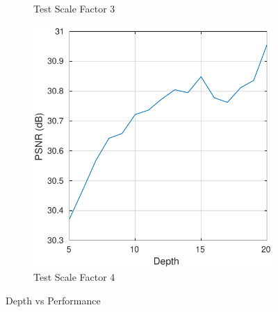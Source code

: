 \documentclass[10pt,twocolumn,letterpaper]{article}
\begin{document}
\begin{figure}[t]
\begin{subfigure}{0.25\textwidth}
		\caption{Test Scale Factor 3}
		\label{fig:tiger}
	\end{subfigure}
	\quad
	\begin{subfigure}{0.25\textwidth}
		\includegraphics[width=\textwidth]{figs/depth_exp3}
		\caption{Test Scale Factor 4}
		\label{fig:mouse}
	\end{subfigure}
	\caption{Depth vs Performance}\label{fig:depth}
\end{figure}
\end{document}
